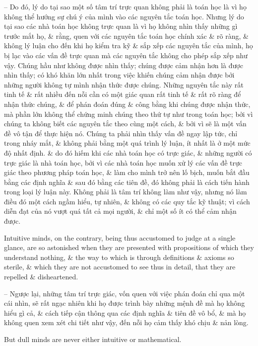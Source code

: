 \documentclass{article}
\begin{document}
\begin{enumerate}
\begin{itemize}
		-- Do đó, lý do tại sao một số tâm trí trực quan không phải là toán học là vì họ không thể hướng sự chú ý của mình vào các nguyên tắc toán học. Nhưng lý do tại sao các nhà toán học không trực quan là vì họ không nhìn thấy những gì trước mắt họ, \& rằng, quen với các nguyên tắc toán học chính xác \& rõ ràng, \& không lý luận cho đến khi họ kiểm tra kỹ \& sắp xếp các nguyên tắc của mình, họ bị lạc vào các vấn đề trực quan mà các nguyên tắc không cho phép sắp xếp như vậy. Chúng hầu như không được nhìn thấy; chúng được cảm nhận hơn là được nhìn thấy; có khó khăn lớn nhất trong việc khiến chúng cảm nhận được bởi những người không tự mình nhận thức được chúng. Những nguyên tắc này rất tinh tế \& rất nhiều đến nỗi cần có một giác quan rất tinh tế \& rất rõ ràng để nhận thức chúng, \& để phán đoán đúng \& công bằng khi chúng được nhận thức, mà phần lớn không thể chứng minh chúng theo thứ tự như trong toán học; bởi vì chúng ta không biết các nguyên tắc theo cùng một cách, \& bởi vì sẽ là một vấn đề vô tận để thực hiện nó. Chúng ta phải nhìn thấy vấn đề ngay lập tức, chỉ trong nháy mắt, \& không phải bằng một quá trình lý luận, ít nhất là ở một mức độ nhất định. \& do đó hiếm khi các nhà toán học có trực giác, \& những người có trực giác là nhà toán học, bởi vì các nhà toán học muốn xử lý các vấn đề trực giác theo phương pháp toán học, \& làm cho mình trở nên lố bịch, muốn bắt đầu bằng các định nghĩa \& sau đó bằng các tiên đề, đó không phải là cách tiến hành trong loại lý luận này. Không phải là tâm trí không làm như vậy, nhưng nó làm điều đó một cách ngầm hiểu, tự nhiên, \& không có các quy tắc kỹ thuật; vì cách diễn đạt của nó vượt quá tất cả mọi người, \& chỉ một số ít có thể cảm nhận được.
		
		Intuitive minds, on the contrary, being thus accustomed to judge at a single glance, are so astonished when they are presented with propositions of which they understand nothing, \& the way to which is through definitions \& axioms so sterile, \& which they are not accustomed to see thus in detail, that they are repelled \& disheartened.
		
		-- Ngược lại, những tâm trí trực giác, vốn quen với việc phán đoán chỉ qua một cái nhìn, sẽ rất ngạc nhiên khi họ được trình bày những mệnh đề mà họ không hiểu gì cả, \& cách tiếp cận thông qua các định nghĩa \& tiên đề vô bổ, \& mà họ không quen xem xét chi tiết như vậy, đến nỗi họ cảm thấy khó chịu \& nản lòng.
		
		But dull minds are never either intuitive or mathematical.
		

\end{itemize}
\end{enumerate}
\end{document}
